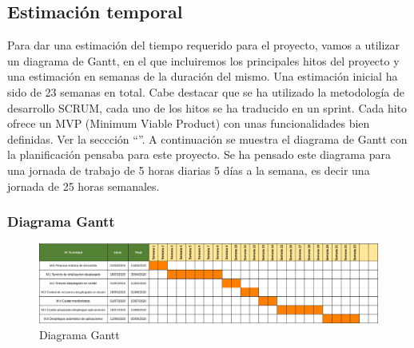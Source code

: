 \subsection{Estimación temporal}
\begin{text}
        Para dar una estimación del tiempo requerido para el proyecto, vamos a utilizar un diagrama de Gantt, en el que incluiremos los principales hitos del proyecto y una estimación en semanas de la duración del mismo. Una estimación inicial ha sido de 23 semanas en total. Cabe destacar que se ha utilizado la metodología de desarrollo SCRUM, cada uno de los hitos se ha traducido en un sprint. Cada hito ofrece un MVP (Minimum Viable Product) con unas funcionalidades bien definidas. Ver la seccción ``''. A continuación se muestra el diagrama de Gantt con la planificación pensaba para este proyecto. Se ha pensado este diagrama para una jornada de trabajo de 5 horas diarias 5 días a la semana, es decir una jornada de 25 horas semanales.
\end{text}

\newpage
\subsubsection{Diagrama Gantt}
        \begin{figure}[!hbt]
                \centering
                \includegraphics[scale=0.4,angle=-90]{imagenes/Planificacion/gannt2.png}
                \caption[Diagrama Gantt]{Diagrama Gantt \cite{Gantt:online}} 
                \label{Diagrama Gannt}
        \end{figure}
\clearpage
